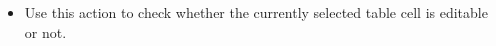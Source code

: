 
\begin{itemize}
\item Use this action to check whether the currently selected table cell is editable or not. 
\end{itemize}

